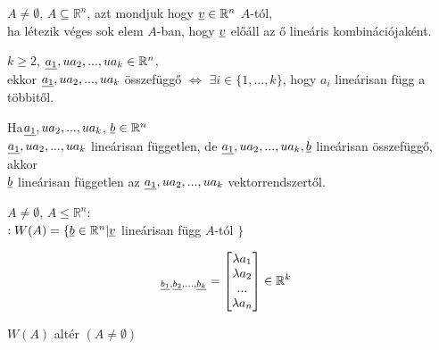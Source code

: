 	\begin{frame}
		\begin{tcolorbox}[title={Def.: Lineáris függőség}]
			$A \neq \emptyset$, $A \subseteq \mathbb{R}^n$, azt mondjuk hogy $\underline{v} \in \mathbb{R}^n$  $A$-tól,\\
			ha létezik véges sok elem $A$-ban, hogy $\underline{v}$ előáll az ő lineáris kombinációjaként.
		\end{tcolorbox}
		
		\begin{tcolorbox}[title={Def.: Lineáris függőség}]
			$k \geq 2$, $\underline{a_1}, u{a_2}, ..., u{a_k} \in \mathbb{R}^n$,\\
			ekkor $\underline{a_1}, u{a_2}, ..., u{a_k}$ összefüggő $\iff$ $\exists i \in \{ 1, ..., k \}$, hogy $a_i$ lineárisan függ a többitől.
		\end{tcolorbox}
		
		\begin{tcolorbox}[title={Áll.: Lineáris függőség}]
			Ha$\underline{a_1}, u{a_2}, ..., u{a_k}$, $\underline{b} \in \mathbb{R}^n$\\		
			$\underline{a_1}, u{a_2}, ..., u{a_k}$ lineárisan független, de $\underline{a_1}, u{a_2}, ..., u{a_k}, \underline{b}$ lineárisan összefüggő, akkor\\
			$\underline{b}$ lineárisan független az $\underline{a_1}, u{a_2}, ..., u{a_k}$ vektorrendszertől.	
		\end{tcolorbox}
		
		\begin{tcolorbox}[title={Def.: Halmaz által generált altér / Lineáris Burok}]
			$A \neq \emptyset$, $A \leq \mathbb{R}^n$:\\
			$: W(A) = \{ \underline{b} \in \mathbb{R}^n | \underline{v}$ lineárisan függ $A$-tól $\}$
		\end{tcolorbox}
		
		\begin{tcolorbox}[title={Def.: Vektor koordinátái}]
			\begin{align}
				[a]_{\u{b_1}, \u{b_2}, ..., \u{b_k}} &= \begin{bmatrix}
					{\lambda}a_1 \\
					{\lambda}a_2 \\
					... \\
					{\lambda}a_n
				\end{bmatrix} \in \mathbb{R}^k
			\end{align}
		\end{tcolorbox}
		
		\begin{tcolorbox}[title={Tétel: Altér}]
			$W(A)$ altér $(A \neq \emptyset)$
		\end{tcolorbox}
	\end{frame}
	
